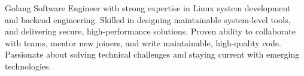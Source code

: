 

\begin{cvparagraph}


Golang Software Engineer with strong expertise in Linux system development and backend engineering. Skilled in designing maintainable system-level tools, and delivering secure, high-performance solutions. Proven ability to collaborate with teams, mentor new joiners, and write maintainable, high-quality code. Passionate about solving technical challenges and staying current with emerging technologies.
\end{cvparagraph}
